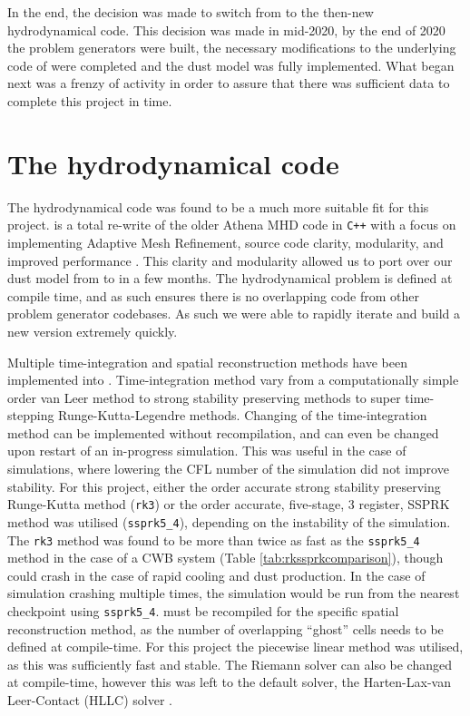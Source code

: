 In the end, the decision was made to switch from \mg{} to the then-new \athena{} hydrodynamical code.
This decision was made in mid-2020, by the end of 2020 the problem generators were built, the necessary modifications to the underlying code of \athena{} were completed and the dust model was fully implemented.
What began next was a frenzy of activity in order to assure that there was sufficient data to complete this project in time.

\section{The \athena{} hydrodynamical code}
\label{sec:athenapp}

The  hydrodynamical code was found to be a much more suitable fit for this project.
\athena{} is a total re-write of the older Athena MHD code in \texttt{C++} with a focus on implementing Adaptive Mesh Refinement, source code clarity, modularity, and improved performance \parencite{stoneAthenaAdaptiveMesh2020}.
This clarity and modularity allowed us to port over our dust model from \mg{} to \athena{} in a few months.
The hydrodynamical problem is defined at compile time, and as such ensures there is no overlapping code from other problem generator codebases.
As such we were able to rapidly iterate and build a new version extremely quickly.

Multiple time-integration and spatial reconstruction methods have been implemented into \athena{}.
Time-integration method vary from a computationally simple  order van Leer \parencite{vanleerUltimateConservativeDifference1979} method to strong stability preserving methods \parencite{ruuthHighOrderStrongStabilityPreservingRungeKutta2005} to super time-stepping Runge-Kutta-Legendre \parencite{meyerStabilizedRungeKuttaLegendreMethod2014} methods.
Changing of the time-integration method can be implemented without recompilation, and can even be changed upon restart of an in-progress simulation.
This was useful in the case of simulations, where lowering the CFL number of the simulation did not improve stability.
For this project, either the  order accurate strong stability preserving Runge-Kutta method (\texttt{rk3}) or the  order accurate, five-stage, 3 register, SSPRK method was utilised (\texttt{ssprk5\_4}), depending on the instability of the simulation.
The \texttt{rk3} method was found to be more than twice as fast as the \texttt{ssprk5\_4} method in the case of a CWB system (Table \ref{tab:rkssprkcomparison}), though could crash in the case of rapid cooling and dust production.
In the case of simulation crashing multiple times, the simulation would be run from the nearest checkpoint using \texttt{ssprk5\_4}. 
\athena{} must be recompiled for the specific spatial reconstruction method, as the number of overlapping ``ghost'' cells needs to be defined at compile-time.
For this project the piecewise linear method was utilised, as this was sufficiently fast and stable.
The Riemann solver can also be changed at compile-time, however this was left to the default solver, the Harten-Lax-van Leer-Contact (HLLC) solver \parencite{toroRestorationContactSurface1994}.

